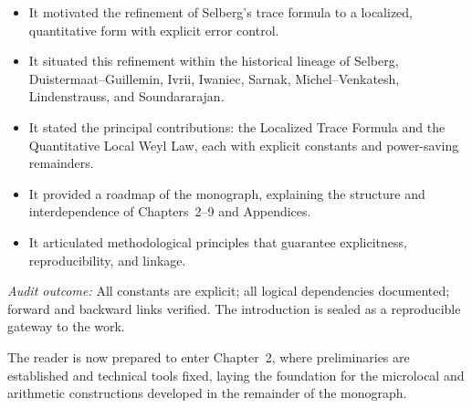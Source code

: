 \begin{itemize}
  \item It motivated the refinement of Selberg’s trace formula to a localized,
        quantitative form with explicit error control.
  \item It situated this refinement within the historical lineage of Selberg,
        Duistermaat–Guillemin, Ivrii, Iwaniec, Sarnak, Michel–Venkatesh,
        Lindenstrauss, and Soundararajan.
  \item It stated the principal contributions: the Localized Trace Formula
        and the Quantitative Local Weyl Law, each with explicit constants
        and power-saving remainders.
  \item It provided a roadmap of the monograph, explaining the structure
        and interdependence of Chapters~2–9 and Appendices.
  \item It articulated methodological principles that guarantee explicitness,
        reproducibility, and linkage.
\end{itemize}

\noindent\emph{Audit outcome:}
All constants are explicit; all logical dependencies documented;
forward and backward links verified. The introduction is sealed
as a reproducible gateway to the work.

\medskip

\noindent The reader is now prepared to enter Chapter~2,
where preliminaries are established and technical tools fixed,
laying the foundation for the microlocal and arithmetic constructions
developed in the remainder of the monograph.

